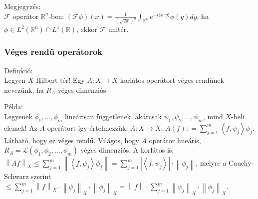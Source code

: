 \documentclass[12pt,a4paper]{scrartcl}
\newenvironment{definicio}{}{}
\newenvironment{megjegyzes}{}{}
\newenvironment{pelda}{}{}
\begin{document}
\begin{megjegyzes}

Megjegyzés:\\
\(\mathcal{F}\) operátor \({\mathbb{R}}^{n}\)-ben:
\(\left( {\mathcal{F}\phi} \right)\left( x \right) = \frac{1}{\left( \sqrt{2\pi} \right)^{n}}{\int_{{\mathbb{R}}^{n}}{e^{- i{\langle{x,y}\rangle}}\phi\left( y \right)dy}}\),
ha
\(\phi \in L^{2}\left( {\mathbb{R}}^{n} \right) \cap L^{1}\left( {\mathbb{R}} \right)\),
ekkor \(\mathcal{F}\) unitér.

\end{megjegyzes}

\hypertarget{veges-rendu-operatorok}{%
\subsubsection{Véges rendű operátorok}\label{veges-rendu-operatorok}}

\begin{definicio}

Definíció:\\
Legyen \(X\) Hilbert tér! Egy \(\left. A:X\rightarrow X \right.\)
korlátos operátort véges rendűnek nevezünk, ha \(R_{A}\) véges
dimenziós.

\end{definicio}

\begin{pelda}

Példa:\\
Legyenek \(\phi_{1},...,\phi_{m}\) lineárisan függetlenek, akárcsak
\(\psi_{1},\psi_{2},...,\psi_{m}\), mind \(X\)-beli elemek! Az \(A\)
operátort így értelmezzük: \(\left. A:X\rightarrow X \right.\),
\(A\left( f \right): = {\sum\limits_{j = 1}^{m}{\left\langle {f,\psi_{j}} \right\rangle\phi_{j}}}\).
Látható, hogy ez véges rendű. Világos, hogy \(A\) operátor lineáris,
\(R_{A} = \mathcal{L}\left( {\phi_{1},\phi_{2},...,\phi_{m}} \right)\)
véges dimenziós. A korlátos is:
\(\left\| {Af} \right\|_{X} \leq {\sum\limits_{j = 1}^{m}\left\| {\left\langle {f,\psi_{j}} \right\rangle\phi_{j}} \right\|} = {\sum\limits_{j = 1}^{m}{\left| \left\langle {f,\psi_{j}} \right\rangle \right| \cdot \left\| \phi_{j} \right\|}}\),
melyre a Cauchy-Schwarz szerint
\(\leq {\sum\limits_{j = 1}^{m}{\left\| f \right\|_{X} \cdot \left\| \psi_{j} \right\|_{X} \cdot \left\| \phi_{j} \right\|_{X}}} = \left\| f \right\| \cdot {\sum\limits_{j = 1}^{m}{\left\| \psi_{j} \right\|_{X} \cdot \left\| \phi_{j} \right\|_{X}}}\).

\end{pelda}
\end{document}
